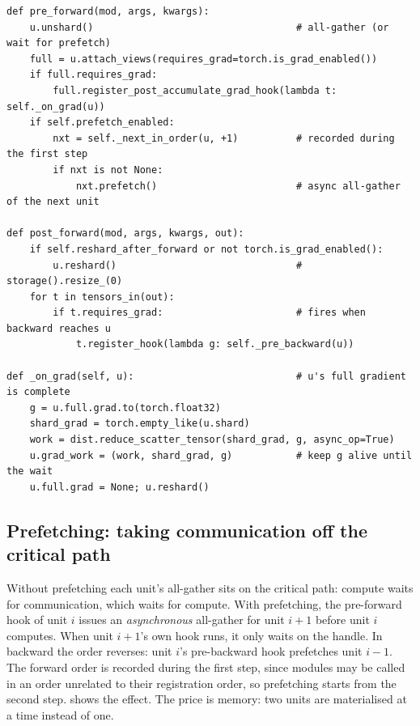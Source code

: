 \begin{lstlisting}[caption={The hooks that drive a unit (abridged from \code{FullyShardedDP}).},label={lst:sharding:hooks}]
def pre_forward(mod, args, kwargs):
    u.unshard()                                   # all-gather (or wait for prefetch)
    full = u.attach_views(requires_grad=torch.is_grad_enabled())
    if full.requires_grad:
        full.register_post_accumulate_grad_hook(lambda t: self._on_grad(u))
    if self.prefetch_enabled:
        nxt = self._next_in_order(u, +1)          # recorded during the first step
        if nxt is not None:
            nxt.prefetch()                        # async all-gather of the next unit

def post_forward(mod, args, kwargs, out):
    if self.reshard_after_forward or not torch.is_grad_enabled():
        u.reshard()                               # storage().resize_(0)
    for t in tensors_in(out):
        if t.requires_grad:                       # fires when backward reaches u
            t.register_hook(lambda g: self._pre_backward(u))

def _on_grad(self, u):                            # u's full gradient is complete
    g = u.full.grad.to(torch.float32)
    shard_grad = torch.empty_like(u.shard)
    work = dist.reduce_scatter_tensor(shard_grad, g, async_op=True)
    u.grad_work = (work, shard_grad, g)           # keep g alive until the wait
    u.full.grad = None; u.reshard()
\end{lstlisting}

\subsection{Prefetching: taking communication off the critical path}

Without prefetching each unit's all-gather sits on the critical path: compute waits for
communication, which waits for compute. With prefetching, the pre-forward hook of unit $i$ issues
an \emph{asynchronous} all-gather for unit $i+1$ before unit $i$ computes. When unit $i+1$'s own
hook runs, it only waits on the handle. In backward the order reverses: unit $i$'s pre-backward
hook prefetches unit $i-1$. The forward order is recorded during the first step, since modules
may be called in an order unrelated to their registration order, so prefetching starts from the
second step.  shows the effect. The price is memory: two units are
materialised at a time instead of one.

